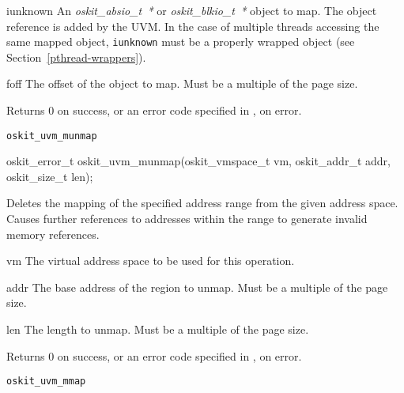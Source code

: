 \begin{apiparm}
        \item[iunknown]
                An \emph{oskit_absio_t~*} or \emph{oskit_blkio_t~*} object to
                map.  The object reference is added by the UVM.  In
                the case of multiple threads accessing the same mapped
                object, {\tt iunknown} must be a properly wrapped
                object (see Section~\ref{pthread-wrappers}).

        \item[foff]
                The offset of the object to map.  Must be a multiple
                of the page size.
\end{apiparm}
\begin{apiret}
        Returns 0 on success, or an error code specified in
        , on error.
\end{apiret}
\begin{apirel}
{\tt oskit_uvm_munmap}
\end{apirel}

\begin{apisyn}

        \funcproto oskit_error_t oskit_uvm_munmap(oskit_vmspace_t vm, oskit_addr_t addr,
                                 oskit_size_t len);
\end{apisyn}
\begin{apidesc}
        Deletes the mapping of the specified address range from the given
	address space.  Causes further references to addresses within the
        range to generate invalid memory references.
\end{apidesc}
\begin{apiparm}
        \item[vm]
                The virtual address space to be used for this operation.

        \item[addr]
                The base address of the region to unmap.  Must be a multiple of
                the page size.

        \item[len]
                The length to unmap.  Must be a multiple of the page size.
\end{apiparm}
\begin{apiret}
        Returns 0 on success, or an error code specified in
        , on error.
\end{apiret}
\begin{apirel}
        {\tt oskit_uvm_mmap}
\end{apirel}

